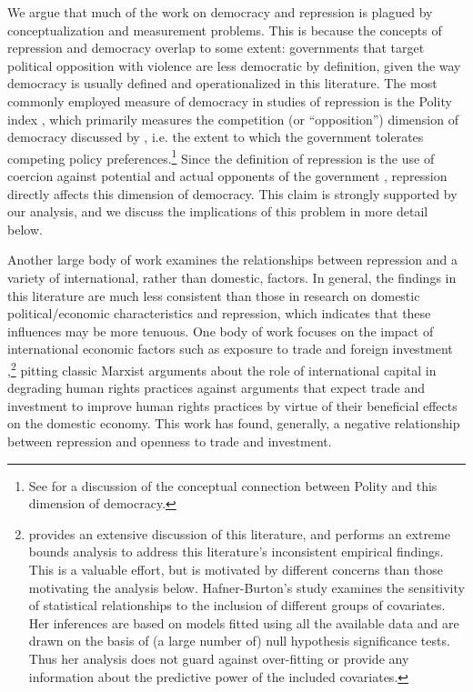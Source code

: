 \documentclass[12pt]{article}
\begin{document}
We argue that much of the work on democracy and repression is plagued by conceptualization and measurement problems. This is because the concepts of repression and democracy overlap to some extent: governments that target political opposition with violence are less democratic by definition, given the way democracy is usually defined and operationalized in this literature. The most commonly employed measure of democracy in studies of repression is the Polity index \citep{MarshallJaggers2009}, which primarily measures the competition (or ``opposition'') dimension of democracy discussed by \citet{Dahl1971}, i.e. the extent to which the government tolerates competing policy preferences.\footnote{See \citet{MunckVerkuilen2002} for a discussion of the conceptual connection between Polity and this dimension of democracy.} Since the definition of repression is the use of coercion against potential and actual opponents of the government \citep[See, e.g.][]{Davenport2007AR}, repression directly affects this dimension of democracy. This claim is strongly supported by our analysis, and we discuss the implications of this problem in more detail below. 

Another large body of  work examines the relationships between repression and a variety of international, rather than domestic, factors. In general, the findings in this literature are much less consistent than those in research on domestic political/economic characteristics and repression, which indicates that these influences may be more tenuous. One body of work focuses on the impact of international economic factors such as exposure to trade and foreign investment \citep{Apodaca2001, RichardsGellenySacko2001, HafnerBurton2005jpr},\footnote{\citet{HafnerBurton2005jpr} provides an extensive discussion of this literature, and performs an extreme bounds analysis \citep{LeamerLeonard1983} to address this literature's inconsistent empirical findings. This is a valuable effort, but is motivated by different concerns than those motivating the analysis below. Hafner-Burton's study examines the sensitivity of statistical relationships to the inclusion of different groups of covariates. Her inferences are based on models fitted using all the available data and are drawn on the basis of (a large number of) null hypothesis significance tests. Thus her analysis does not guard against over-fitting or provide any information about the predictive power of the included covariates.} pitting classic Marxist arguments about the role of international capital in degrading human rights practices against arguments that expect trade and investment to improve human rights practices by virtue of their beneficial effects on the domestic economy. This work has found, generally, a negative relationship between repression and openness to trade and investment.  
\end{document}
